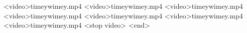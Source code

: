 <video>timeywimey.mp4
<video>timeywimey.mp4
<video>timeywimey.mp4
<video>timeywimey.mp4
<video>timeywimey.mp4
<video>timeywimey.mp4
<video>timeywimey.mp4
<stop video>
<end>
